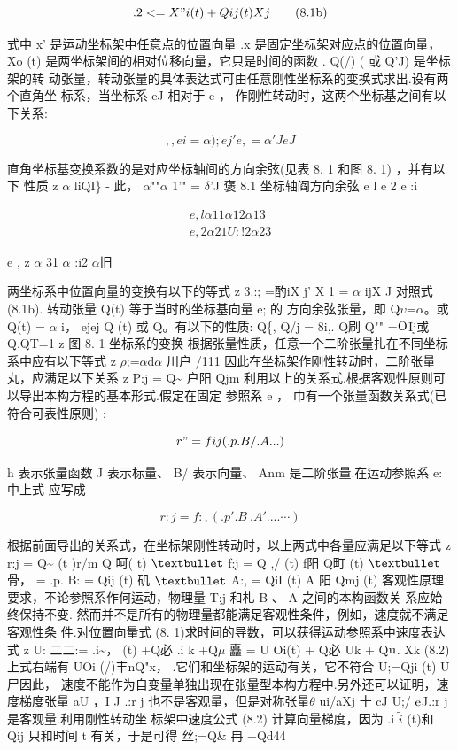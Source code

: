 \begin{equation*}.2< = X"i (t) + Qij (t)Xj\tag{8.1b}\end{equation*}

式中 x' 是运动坐标架中任意点的位置向量 .x 是固定坐标架对应点的位置向量， Xo (t) 是两坐标架间的相对位移向量，它只是时间的函数 . Q(/) ( 或 Q'J) 是坐标架的转 动张量，转动张量的具体表达式可由任意刚性坐标系的变换式求出.设有两个直角坐 标系，当坐标系 eJ 相对于 e ， 作刚性转动时，这两个坐标基之间有以下关系:

\[, , ei = \alpha );e j' e, = \alpha  'JeJ\]

直角坐标基变换系数的是对应坐标轴间的方向余弦(见表 8. 1 和图 8. 1) ，并有以下 性质 z $\alpha$ liQI\} - 此， $\alpha$""$\alpha$ 1'" = $\delta$'J 褒 8.1 坐标轴阎方向余弦 e l e 2 e :i

\begin{gather*}
e , l \alpha 11 \alpha 1 2 \alpha 13\\
e , 2 \alpha  2 1 U :!2 \alpha 2 3
\end{gather*}

e , z $\alpha$ 31 $\alpha$ :i2 $\alpha$旧

两坐标系中位置向量的变换有以下的等式 z 3.:; =酌iX j' X 1 = $\alpha$ ijX J 对照式 (8.1b). 转动张量 Q(t) 等于当时的坐标基向量 e; 的 方向余弦张量，即 Q$\upsilon$=$\alpha$。或 Q(t) = $\alpha$ i， ejej Q (t) 或 Q。有以下的性质: Q\{, Q/j = 8i,. Q刷 Q"" =${\rm O}$Ij或 Q.QT=1 z 图 8. 1 坐标系的变换 根据张量性质，任意一个二阶张量扎在不同坐标系中应有以下等式 z $\rho$;=$\alpha$d$\alpha$ 川户 /111 因此在坐标架作刚性转动时，二阶张量丸，应满足以下关系 z P:j = Q\textasciitilde{} 户阳 Qjm 利用以上的关系式.根据客观性原则可以导出本构方程的基本形式.假定在固定 参照系 e ， 巾有一个张量函数关系式(已符合可表性原则) :

\[r" = fij (.p .B/ .A...)\]

h 表示张量函数 J 表示标量、 B/ 表示向量、 Anm 是二阶张量.在运动参照系 e: 中上式 应写成

\[r:j = f:, (.p' .B~ .A'....\cdots )\]

根据前面导出的关系式，在坐标架刚性转动时，以上两式中各量应满足以下等式 z r:j = Q\textasciitilde{} (t )r/m Q 呵( t) ${\rm •}$ f:j = Q ,/ (t) f阳 Q町 (t) ${\rm •}$ 骨， = .p. B: = Qij (t) 矶 ${\rm •}$ A:, = QiI (t) A 阳 Qmj (t) 客观性原理要求，不论参照系作何运动，物理量 T;j 和札 B 、 A 之间的本构函数关 系应始终保持不变. 然而并不是所有的物理量都能满足客观性条件，例如，速度就不满足客观性条 件.对位置向量式 (8. 1)求时间的导数，可以获得运动参照系中速度表达式 z U: 二二:= .i\textasciitilde{}， (t) +Q必 .i k +Q$\mu$ 矗 = U Oi(t) + Q必 Uk + Q${\rm u}$. Xk (8.2) 上式右端有 UOi (/)丰nQ"x， .它们和坐标架的运动有关，它不符合 U;=Qji (t) U尸因此， 速度不能作为自变量单独出现在张量型本构方程中.另外还可以证明，速度梯度张量 aU ，I J .:r j 也不是客观量，但是对称张量$\theta$ ui/aXj 十 cJ U;/ ${\rm e}$J.:r j 是客观量.利用刚性转动坐 标架中速度公式 (8.2) 计算向量梯度，因为 .i $\tilde{i}$ (t)和 Qij 只和时间 t 有关，于是可得 丝;=Q\& 冉 +Qd44


